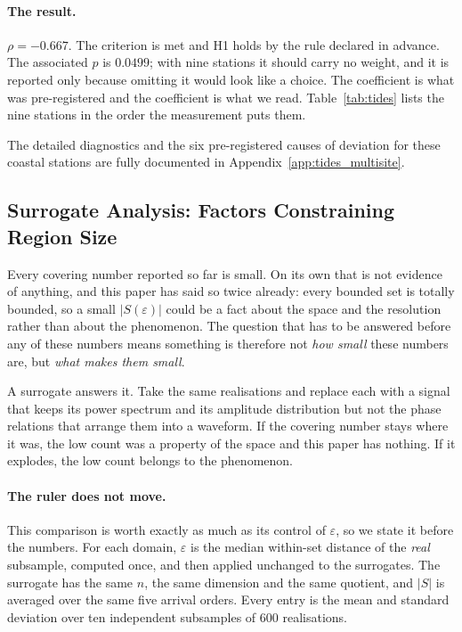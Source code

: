 \documentclass[10pt]{article}
\theoremstyle{plain}
\theoremstyle{definition}
\theoremstyle{remark}
\newcommand{\fitwidth}[1]{%
  \resizebox{\ifdim\width>\linewidth\linewidth\else\width\fi}{!}{#1}}
\begin{document}
\paragraph{The result.}
$\rho = -0.667$. The criterion is met and H1 holds by the rule declared in
advance. The associated $p$ is $0.0499$; with nine stations it should carry no
weight, and it is reported only because omitting it would look like a choice.
The coefficient is what was pre-registered and the coefficient is what we read.
Table~\ref{tab:tides} lists the nine stations in the order the measurement puts
them.

\begin{table}[!htbp]\centering\small
\fitwidth{}
\caption{\small The nine stations, ordered by the measured $\varepsilon$. The
prediction was that this ordering would follow the range column, declared
before any $\varepsilon$ existed. The compression column is against the
amplitude-adjusted surrogate of Section~\ref{sec:surrogates}.}
\label{tab:tides}
\end{table}


The detailed diagnostics and the six pre-registered causes of deviation for these coastal stations are fully documented in Appendix~\ref{app:tides_multisite}.

\subsection{Surrogate Analysis: Factors Constraining Region Size}
\label{sec:surrogates}

Every covering number reported so far is small. On its own that is not evidence
of anything, and this paper has said so twice already: every bounded set is
totally bounded, so a small $|S(\varepsilon)|$ could be a fact about the space
and the resolution rather than about the phenomenon. The question that has to
be answered before any of these numbers means something is therefore not
\emph{how small} these numbers are, but \emph{what makes them small}.

A surrogate answers it. Take the same realisations and replace each with a
signal that keeps its power spectrum and its amplitude distribution but not the
phase relations that arrange them into a waveform. If the covering number stays
where it was, the low count was a property of the space and this paper has nothing. If it
explodes, the low count belongs to the phenomenon.

\paragraph{The ruler does not move.}
This comparison is worth exactly as much as its control of $\varepsilon$, so we
state it before the numbers. For each domain, $\varepsilon$ is the median
within-set distance of the \emph{real} subsample, computed once, and then
applied unchanged to the surrogates. The surrogate has the same $n$, the same
dimension and the same quotient, and $|S|$ is averaged over the same five
arrival orders. Every entry is the mean and standard deviation over ten
independent subsamples of $600$ realisations.
\end{document}
